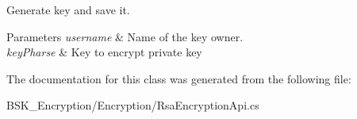 Generate key and save it. 


\begin{DoxyParams}{Parameters}
{\em username} & Name of the key owner.\\
\hline
{\em key\+Pharse} & Key to encrypt private key\\
\hline
\end{DoxyParams}


The documentation for this class was generated from the following file\+:\begin{DoxyCompactItemize}
\item 
B\+S\+K\+\_\+\+Encryption/\+Encryption/Rsa\+Encryption\+Api.\+cs\end{DoxyCompactItemize}
